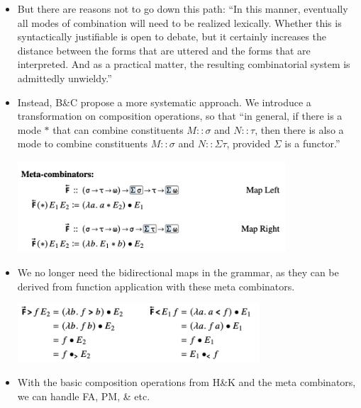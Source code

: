 \documentclass{article}
\begin{document}
\begin{itemize}
\begin{exe}
\begin{center}
      \end{center}
  \end{exe}
  \item But there are reasons not to go down this path: ``In this manner, eventually all modes of combination will need to be realized
  lexically. Whether this is syntactically justifiable is open to debate, but it
  certainly increases the distance between the forms that are uttered and the forms
  that are interpreted. And as a practical matter, the resulting combinatorial
  system is admittedly unwieldy.''

  \item Instead, B\&C propose a more systematic approach. We introduce a transformation on composition operations,
    so that ``in general, if there is a mode $*$ that can combine constituents $M :: \sigma$ and $N :: \tau$, then
    there is also a mode to combine constituents $M :: \sigma$ and $N :: \Sigma\tau$, provided $\Sigma$ is a functor.''
    \begin{center}
      \includegraphics[width=10cm]{clips/16.png}
    \end{center}
  \item We no longer need the bidirectional maps in the grammar, as they can be derived from function application with these meta combinators.
  \begin{exe}
    \ex \label{17} \hfill
      \begin{center}
        \includegraphics[width=9cm]{clips/17.png}
      \end{center}
  \end{exe}
  \item With the basic composition operations from H\&K and the meta combinators, we can handle FA, PM, \& etc.
  \begin{exe}
    \ex \label{18} \hfill
      \begin{center}

\end{center}
\end{exe}
\end{itemize}
\end{document}
